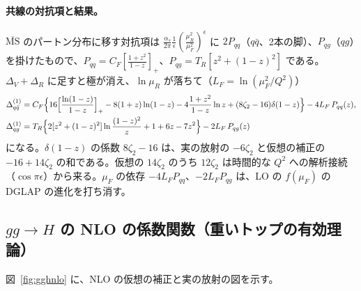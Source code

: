 \documentclass[a4paper,10pt]{ltjsarticle}
\newcommand{\MSbar}{\overline{\mathrm{MS}}}
\begin{document}
\paragraph{共線の対抗項と結果。}$\MSbar$ のパートン分布に移す対抗項は $\frac{\alpha_s}{2\pi}\frac1\epsilon(\frac{\mu_R^2}{\mu_F^2})^\epsilon$ に $2P_{qq}$（$q\bar q$、2本の脚）、$P_{qg}$（$qg$）を掛けたもので、$P_{qq}=C_F[\frac{1+z^2}{1-z}]_+$、$P_{qg}=T_R[z^2+(1-z)^2]$ である。$\Delta_V+\Delta_R$ に足すと極が消え、$\ln\mu_R$ が落ちて（$L_F=\ln(\mu_F^2/Q^2)$）
\begin{align}
\Delta^{(1)}_{q\bar q}&=C_F\Bigl\{16\Bigl[\frac{\ln(1-z)}{1-z}\Bigr]_+-8(1+z)\ln(1-z)-4\frac{1+z^2}{1-z}\ln z+(8\zeta_2-16)\delta(1-z)\Bigr\}-4L_F\,P_{qq}(z),\label{eq:dqq}\\
\Delta^{(1)}_{qg}&=T_R\Bigl\{2[z^2+(1-z)^2]\ln\frac{(1-z)^2}z+1+6z-7z^2\Bigr\}-2L_F\,P_{qg}(z)\label{eq:dqg}
\end{align}
になる。$\delta(1-z)$ の係数 $8\zeta_2-16$ は、実の放射の $-6\zeta_2$ と仮想の補正の $-16+14\zeta_2$ の和である。仮想の $14\zeta_2$ のうち $12\zeta_2$ は時間的な $Q^2$ への解析接続（$\cos\pi\epsilon$）から来る。$\mu_F$ の依存 $-4L_FP_{qq}$、$-2L_FP_{qg}$ は、LO の $f(\mu_F)$ の DGLAP の進化を打ち消す。

\subsection{$gg\to H$ の NLO の係数関数（重いトップの有効理論）}\label{sec:gghcoef}

図~\ref{fig:gghnlo} に、NLO の仮想の補正と実の放射の図を示す。
\end{document}
